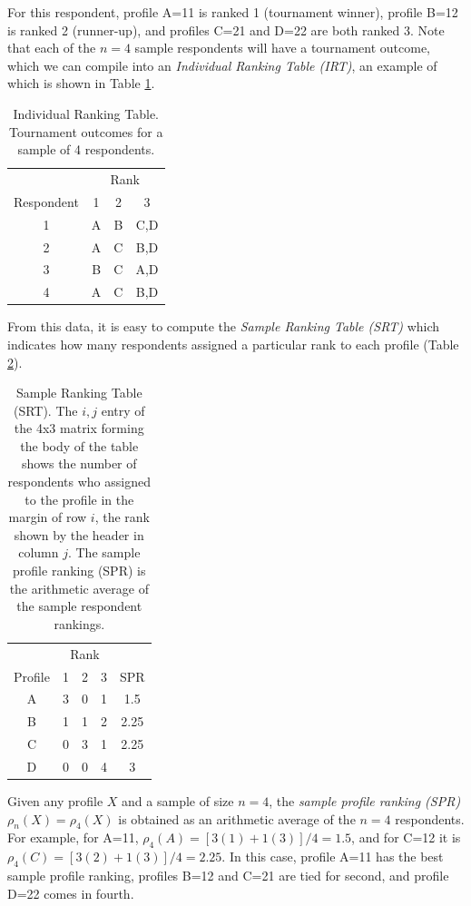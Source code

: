 \documentclass[a4paper, 12pt]{article}
\begin{document}
{\flushleft For} this respondent, profile A=11 is ranked 1 (tournament winner), profile B=12 is ranked 2 (runner-up), and profiles C=21 and D=22 are both ranked 3. Note that each of the $n=4$ sample respondents will have a tournament outcome, which we can compile into an \emph{Individual Ranking Table (IRT)}, an example of which is shown in Table  \ref{Tab1}.
\begin{table}[!htpb]
\centering
\scriptsize
\begin{tabular}{c|ccc}
&\multicolumn{3}{c}{Rank}\\
Respondent& 1 & 2 & 3\\\hline
1& A&B&C,D\\
2& A &C&B,D \\
3& B &C&A,D \\
4& A &C&B,D \\
\end{tabular}
\caption{Individual Ranking Table. Tournament outcomes for a sample of 4 respondents.}
\label{Tab1}
\end{table}
{\flushleft From} this data, it is easy to compute the \emph{Sample Ranking Table (SRT)} which indicates how many respondents assigned a particular rank to each profile (Table \ref{Tab2}).

\begin{table}[!htpb]
\scriptsize
\centering
\begin{tabular}{c|ccc|c}
&\multicolumn{3}{c}{Rank}&\\
Profile& 1 & 2 & 3&SPR\\\hline
A& 3&0&1&1.5\\
B& 1 &1&2 &2.25\\
C& 0 &3&1&2.25 \\
D& 0 &0&4&3 \\
\end{tabular}
\caption{Sample Ranking Table (SRT). The $i,j$ entry of the 4x3 matrix forming the body of the table shows the number of respondents who assigned to  the profile in the margin of row $i$, the rank shown by the header in column $j$. The sample profile ranking (SPR) is the arithmetic average of the sample respondent rankings.}
\label{Tab2}
\end{table}


Given any profile $X$ and a sample of size $n=4$, the \emph{sample profile ranking (SPR)} $\rho_n(X)=\rho_4(X)$ is obtained as an arithmetic average of the $n=4$ respondents.  For example, for A=11, $\rho_4(A)=[3(1)+1(3)]/4=1.5$, and for C=12 it is $\rho_4(C) = [3(2)+1(3)]/4=2.25$.
In this case, profile A=11 has the best sample profile ranking, profiles B=12 and C=21 are tied for second, and profile D=22 comes in fourth.
\end{document}
